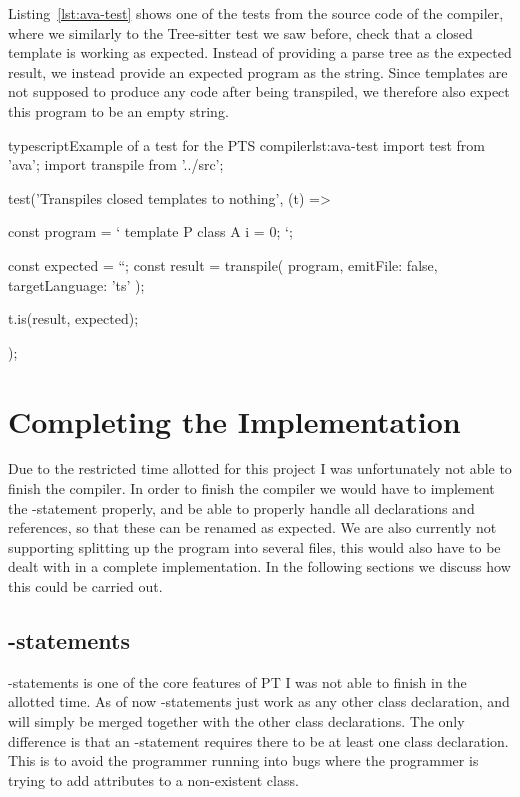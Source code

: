 Listing~\vref{lst:ava-test} shows one of the tests from the source code of the compiler, where we similarly to the Tree-sitter test we saw before, check that a closed template is working as expected.
Instead of providing a parse tree as the expected result, we instead provide an expected program as the string.
Since templates are not supposed to produce any code after being transpiled, we therefore also expect this program to be an empty string.

\begin{code}{typescript}{Example of a test for the PTS compiler}{lst:ava-test}
    import test from 'ava';
    import transpile from '../src';

    test('Transpiles closed templates to nothing', (t) => {
        const program = `
    template P {
        class A {
            i = 0;
        }
    }
    `;

        const expected = ``;
        const result = transpile(
            program,
            { emitFile: false, targetLanguage: 'ts' }
        );

        t.is(result, expected);
    });
\end{code}

\section{Completing the Implementation}\label{sec:completing-the-implementation}

Due to the restricted time allotted for this project I was unfortunately not able to finish the compiler.
In order to finish the compiler we would have to implement the -statement properly, and be able to properly handle all declarations and references, so that these can be renamed as expected.
We are also currently not supporting splitting up the program into several files, this would also have to be dealt with in a complete implementation.
In the following sections we discuss how this could be carried out.

\subsection{-statements}\label{subsec:addto-statements}

-statements is one of the core features of PT I was not able to finish in the allotted time.
As of now -statements just work as any other class declaration, and will simply be merged together with the other class declarations.
The only difference is that an -statement requires there to be at least one class declaration.
This is to avoid the programmer running into bugs where the programmer is trying to add attributes to a non-existent class.

